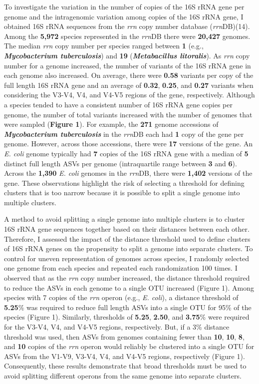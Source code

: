 \documentclass[
]{article}
\begin{document}
To investigate the variation in the number of copies of the 16S rRNA
gene per genome and the intragenomic variation among copies of the 16S
rRNA gene, I obtained 16S rRNA sequences from the \emph{rrn} copy number
database (\emph{rrn}DB)(14). Among the \textbf{5,972} species
represented in the \emph{rrn}DB there were \textbf{20,427} genomes. The
median \emph{rrn} copy number per species ranged between \textbf{1}
(e.g., \textbf{\emph{Mycobacterium tuberculosis}}) and \textbf{19}
(\textbf{\emph{Metabacillus litoralis}}). As \emph{rrn} copy number for
a genome increased, the number of variants of the 16S rRNA gene in each
genome also increased. On average, there were \textbf{0.58} variants per
copy of the full length 16S rRNA gene and an average of \textbf{0.32},
\textbf{0.25}, and \textbf{0.27} variants when considering the V3-V4,
V4, and V4-V5 regions of the gene, respectively. Although a species
tended to have a consistent number of 16S rRNA gene copies per genome,
the number of total variants increased with the number of genomes that
were sampled (\textbf{Figure 1}). For example, the \textbf{271} genome
accessions of \textbf{\emph{Mycobacterium tuberculosis}} in the
\emph{rrn}DB each had \textbf{1} copy of the gene per genome. However,
across those accessions, there were \textbf{17} versions of the gene. An
\emph{E. coli} genome typically had \textbf{7} copies of the 16S rRNA
gene with a median of \textbf{5} distinct full length ASVs per genome
(intraquartile range between \textbf{3} and \textbf{6}). Across the
\textbf{1,390} \emph{E. coli} genomes in the \emph{rrn}DB, there were
\textbf{1,402} versions of the gene. These observations highlight the
risk of selecting a threshold for defining clusters that is too narrow
because it is possible to split a single genome into multiple clusters.

A method to avoid splitting a single genome into multiple clusters is to
cluster 16S rRNA gene sequences together based on their distances
between each other. Therefore, I assessed the impact of the distance
threshold used to define clusters of 16S rRNA genes on the propensity to
split a genome into separate clusters. To control for uneven
representation of genomes across species, I randomly selected one genome
from each species and repeated each randomization 100 times. I observed
that as the \emph{rrn} copy number increased, the distance threshold
required to reduce the ASVs in each genome to a single OTU increased
(Figure 1). Among species with 7 copies of the \emph{rrn} operon (e.g.,
\emph{E. coli}), a distance threshold of \textbf{5.25}\% was required to
reduce full length ASVs into a single OTU for 95\% of the species
(Figure 1). Similarly, thresholds of \textbf{5.25}, \textbf{2.50}, and
\textbf{3.75}\% were required for the V3-V4, V4, and V4-V5 regions,
respectively. But, if a 3\% distance threshold was used, then ASVs from
genomes containing fewer than \textbf{10}, \textbf{10}, \textbf{8}, and
\textbf{10} copies of the \emph{rrn} operon would reliably be clustered
into a single OTU for ASVs from the V1-V9, V3-V4, V4, and V4-V5 regions,
respectively (Figure 1). Consequently, these results demonstrate that
broad thresholds must be used to avoid splitting different operons from
the same genome into separate clusters.
\end{document}
